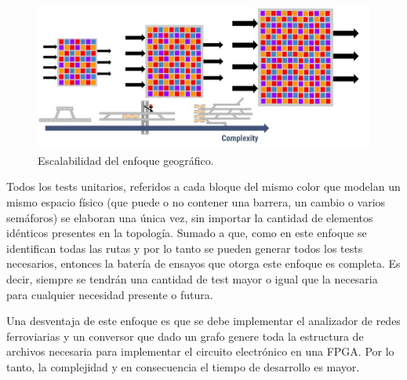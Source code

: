 			\begin{figure}[h]
			\centering
				\includegraphics[scale=.4]{./Figures/Geografico_complejidad}
				\caption{Escalabilidad del enfoque geográfico.}
				\label{fig:Escala_Geografico}
			\end{figure}
		
			Todos los tests unitarios, referidos a cada bloque del mismo color que modelan un mismo espacio físico (que puede o no contener una barrera, un cambio o varios semáforos) se elaboran una única vez, sin importar la cantidad de elementos idénticos presentes en la topología. Sumado a que, como en este enfoque se identifican todas las rutas y por lo tanto se pueden generar todos los tests necesarios, entonces la batería de ensayos que otorga este enfoque es completa. Es decir, siempre se tendrán una cantidad de test mayor o igual que la necesaria para cualquier necesidad presente o futura.
		
			Una desventaja de este enfoque es que se debe implementar el analizador de redes ferroviarias y un conversor que dado un grafo genere toda la estructura de archivos necesaria para implementar el circuito electrónico en una FPGA. Por lo tanto, la complejidad y en consecuencia el tiempo de desarrollo es mayor.
			
			
			
